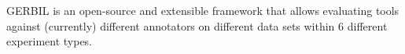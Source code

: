GERBIL is an open-source and extensible framework that allows evaluating tools against (currently) \overallGERBILannotators different annotators on \overalldatasets different data sets within 6 different experiment types. 
